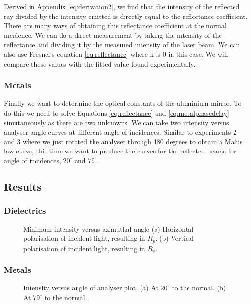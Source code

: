\documentclass{article}
\begin{document}
Derived in Appendix \ref{eq:derivation2}, we find that the intensity of 
the reflected ray divided by the intensity emitted is directly equal to 
the reflectance coefficient. There are many ways of obtaining this 
reflectance coefficient at the normal incidence. We can do a direct 
measurement by taking the intensity of the reflectance and dividing it 
by the measured intensity of the laser beam. We can also use Fresnel's 
equation \ref{eq:reflectance} where k is 0 in this case. We will compare 
these values with the fitted value found experimentally.

\subsubsection{Metals}
Finally we want to determine the optical constants of the aluminium 
mirror. To do this we need to solve Equations \ref{eq:reflectance} and 
\ref{eq:metalphasedelay} simutaneously as there are two unknowns. We 
can take two intensity versus analyser angle curves at different angle 
of incidences. Similar to experiments 2 and 3 where we just rotated 
the analyser through 180 degrees to obtain a Malus law curve, this time 
we want to produce the curves for the reflected beams for angle of 
incidences, $20^\circ$ and $79^\circ$.

\subsection{Results}
\subsubsection{Dielectrics}

\begin{figure} [H]
    \centering
    \scalebox{0.5}{}
    \hspace{0.5cm}
    \scalebox{0.5}{}
    \caption{Minimum intensity versus azimuthal angle (a) Horizontal 
    polarisation of incident light, resulting in $R_p$. (b) Vertical 
    polarisation of incident light, resulting in $R_s$.}
    \label{plot:fresnel}
\end{figure}

\subsubsection{Metals}

\begin{figure} [H]
    \centering
    \scalebox{0.5}{}
    \hspace{0.5cm}
    \scalebox{0.5}{}
    \caption{Intensity versus angle of analyser plot. (a) At $20^\circ$
    to the normal. (b) At $79^\circ$ to the normal.}
    \label{plot:metals}
\end{figure}
\end{document}
